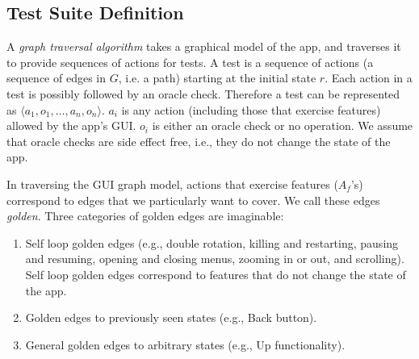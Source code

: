 \subsection{Test Suite Definition}
\label{sec:testSuiteDefinition}



A \emph{graph traversal algorithm} takes a graphical model of the app, and traverses it to provide sequences of actions for tests. A test is a sequence of actions (a sequence of edges in $G$, i.e. a path) starting at the initial state $r$. Each action in a test is possibly followed by an oracle check. Therefore a test can be represented as $\langle a_1, o_1, \dots, a_n, o_n \rangle$. $a_i$ is any action (including those that exercise features) allowed by the app's GUI. $o_i$ is either an oracle check or no operation. We assume that oracle checks are side effect free, i.e., they do not change the state of the app.




In traversing the GUI graph model, actions that exercise features ($A_f$'s) correspond to edges that we particularly want to cover. We call these edges \emph{golden}. Three categories of golden edges are imaginable:
\begin{enumerate}
\item Self loop golden edges (e.g., double rotation, killing and restarting, pausing and resuming, opening and closing menus, zooming in or out, and scrolling). Self loop golden edges correspond to features that do not change the state of the app.
\item Golden edges to previously seen states (e.g., Back button).
\item General golden edges to arbitrary states (e.g., Up functionality).
\end{enumerate}


